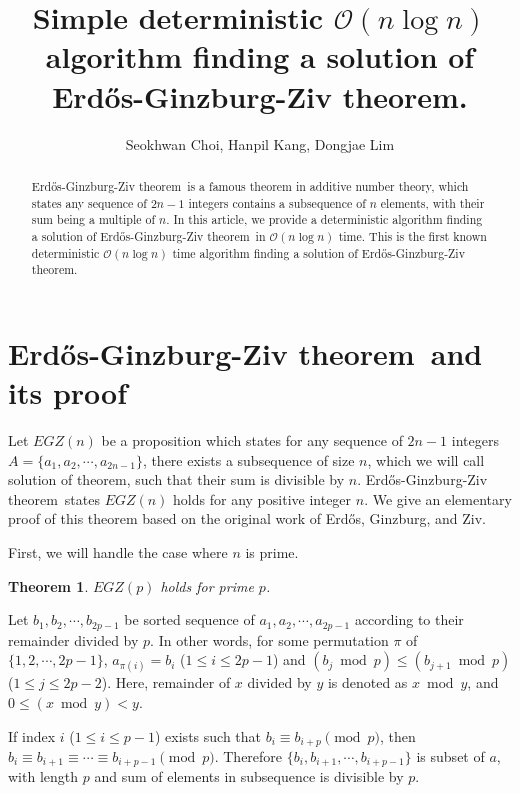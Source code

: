 \documentclass[11pt]{article}
\newtheorem{theorem}{Theorem}
\newcommand{\EGZT}{Erd\H{o}s-Ginzburg-Ziv theorem}
\begin{document}
\title{Simple deterministic $\mathcal{O}(n \log n)$ algorithm finding a solution of Erdős-Ginzburg-Ziv theorem.}
 
\author{Seokhwan Choi, Hanpil Kang, Dongjae Lim}
\maketitle
\setcounter{page}{1}

\begin{abstract}
    \EGZT\ is a famous theorem in additive number theory, which states any sequence of $2n-1$ integers contains a subsequence of $n$ elements, with their sum being a multiple of $n$. In this article, we provide a deterministic algorithm finding a solution of \EGZT\ in $\mathcal{O}(n \log n)$ time. This is the first known deterministic $\mathcal{O}(n \log n)$ time algorithm finding a solution of \EGZT.
\end{abstract}


\section{\EGZT\ and its proof}

Let $EGZ(n)$ be a proposition which states for any sequence of $2n-1$ integers $A = \{{a}_{1}, {a}_{2}, \cdots, {a}_{2n-1}\}$, there exists a subsequence of size $n$, which we will call solution of theorem, such that their sum is divisible by $n$. \EGZT\ states $EGZ(n)$ holds for any positive integer $n$. \cite{1zbMATH03102822} We give an elementary proof of this theorem based on the original work of Erd\H{o}s, Ginzburg, and Ziv. 



First, we will handle the case where $n$ is prime.

\begin{theorem}
$EGZ(p)$ holds for prime $p$.
\end{theorem}

Let $b_1, b_2, \cdots, b_{2p-1}$ be sorted sequence of $a_1, a_2, \cdots, a_{2p-1}$ according to their remainder divided by $p$. In other words, for some permutation $\pi$ of $\{1, 2, \cdots, 2p-1\}$, $a_{\pi(i)} = b_i$ ($1 \le i \le 2p-1$) and $(b_j \bmod p) \le (b_{j+1} \bmod p)$ ($1 \le j \le 2p-2$). Here, remainder of $x$ divided by $y$ is denoted as $x \bmod y$, and $0 \le (x \bmod y) < y$.

If index $i$ ($1 \le i \le p-1$) exists such that $b_{i} \equiv b_{i+p} \pmod{p}$, then $b_{i} \equiv b_{i+1} \equiv \cdots \equiv b_{i+p-1} \pmod{p}$. Therefore $\{b_i, b_{i+1}, \cdots, b_{i+p-1}\}$ is subset of $a$, with length $p$ and sum of elements in subsequence is divisible by $p$.
\end{document}
